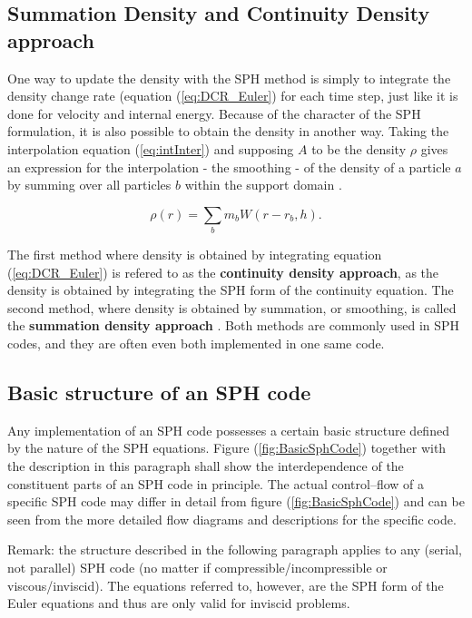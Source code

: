 \documentclass{report}
\begin{document}
\subsection{Summation Density and Continuity Density approach}
\label{sec:DensCalcMode}
One way to update the density with the SPH method is simply to integrate the density 
change rate (equation (\ref{eq:DCR_Euler}) for each time step, just like it is done for velocity 
and internal energy. Because of the character of the SPH formulation, it is also  
possible to obtain the density in another way. Taking the interpolation equation 
(\ref{eq:intInter}) and supposing $A$ to be the density $\rho$ gives an expression for 
the interpolation - the smoothing - of the density of a particle $a$ by summing over 
all particles $b$ within the support domain \cite{Monaghan2005}.

\begin{equation}
\label{eq:SumDensity}
\rho(r)=\sum_b m_b W(r-r_b,h).
\end{equation}

The first method where density is obtained by integrating equation (\ref{eq:DCR_Euler}) is refered 
to as the {\bf continuity density approach}, as the density is obtained by integrating the SPH form of the continuity equation. The second method, where density is obtained by 
summation, or smoothing, is called the {\bf summation density approach} \cite{Liu2003}. 
Both methods are commonly used in SPH codes, and they are often even both implemented 
in one same code. 

\subsection{Basic structure of an SPH code}

Any implementation of an SPH code possesses a certain basic structure defined by the 
nature of the SPH equations. Figure (\ref{fig:BasicSphCode}) together with the description in this paragraph shall show the interdependence of the 
constituent parts of an SPH code in principle. The actual control--flow of a specific
SPH code may differ in detail from figure (\ref{fig:BasicSphCode}) and can be seen 
from the more detailed flow diagrams and descriptions for the specific code.

Remark: the structure described in the following paragraph applies to any (serial, not parallel) SPH code (no matter if compressible/incompressible or viscous/inviscid). The equations referred to, however, are the SPH form of the Euler equations and thus are only valid for inviscid problems.
\end{document}
